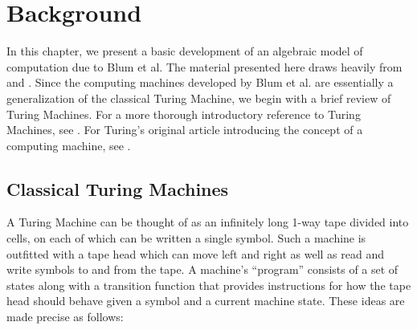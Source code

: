 \chapter{Background}
\label{chap:background}

In this chapter, we present a basic development of an algebraic model
of computation due to Blum et al.  The material presented here draws
heavily from \cite{B89} and \cite{B98}.  Since the computing machines
developed by Blum et al. are essentially a generalization of the
classical Turing Machine, we begin with a brief review of Turing
Machines.  For a more thorough introductory reference to Turing
Machines, see \cite{S06}.  For Turing's original article introducing
the concept of a computing machine, see \cite{T36}.

\section{Classical Turing Machines}

A Turing Machine can be thought of as an infinitely long 1-way tape
divided into cells, on each of which can be written a single symbol.
Such a machine is outfitted with a tape head which can move left and
right as well as read and write symbols to and from the tape. A
machine's ``program'' consists of a set of states along with a
transition function that provides instructions for how the tape head
should behave given a symbol and a current machine state.  These ideas
are made precise as follows:

